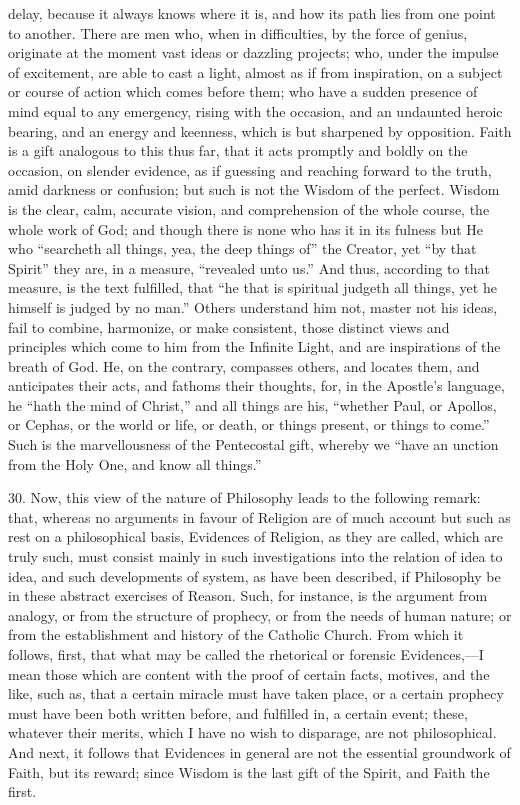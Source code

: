 delay, because it always knows where it is, and how its path lies from
one point to another. There are men who, when in difficulties, by the
force of genius, originate at the moment vast ideas or dazzling
projects; who, under the impulse of excitement, are able to cast a
light, almost as if from inspiration, on a subject or course of action
which comes before them; who have a sudden presence of mind equal to
any emergency, rising with the occasion, and an undaunted heroic
bearing, and an energy and keenness, which is but sharpened by
opposition. Faith is a gift analogous to this thus far, that it acts
promptly and boldly on the occasion, on slender evidence, as if
guessing and reaching forward to the truth, amid darkness or
confusion; but such is not the Wisdom of the perfect. Wisdom is the
clear, calm, accurate vision, and comprehension of the whole course,
the whole work of God; and though there is none who has it in its
fulness but He who ``searcheth all things, yea, the deep things
of'' the Creator, yet ``by that Spirit'' they are, in a
measure, ``revealed unto us.'' And thus, according to that
measure, is the text fulfilled, that ``he that is spiritual
judgeth all things, yet he himself is judged by no man.'' Others
understand him not, master not his ideas, fail to combine, harmonize,
or make consistent, those distinct views and principles which come to
him from the Infinite Light, and are inspirations of the breath of
God. He, on the contrary, compasses others, and locates them, and
anticipates their acts, and fathoms their thoughts, for, in the
Apostle's language, he ``hath the mind of Christ,'' and all
things are his, ``whether Paul, or Apollos, or Cephas, or the
world or life, or death, or things present, or things to come.''
Such is the marvellousness of the Pentecostal gift, whereby we
``have an unction from the Holy One, and know all things.''

30. Now, this view of the nature of Philosophy leads to the
following remark: that, whereas no arguments in favour of Religion are
of much account but such as rest on a philosophical basis, Evidences
of Religion, as they are called, which are truly such, must consist
mainly in such investigations into the relation of idea to idea, and
such developments of system, as have been described, if Philosophy be
in these abstract exercises of Reason. Such, for instance, is the
argument from analogy, or from the structure of prophecy, or from the
needs of human nature; or from the establishment and history of the
Catholic Church. From which it follows, first, that what may be called
the rhetorical or forensic Evidences,—I mean those which are content
with the proof of certain facts, motives, and the like, such as, that
a certain miracle must have taken place, or a certain prophecy must
have been both written before, and fulfilled in, a certain event;
these, whatever their merits, which I have no wish to disparage, are
not philosophical. And next, it follows that Evidences in general are
not the essential groundwork of Faith, but its reward; since Wisdom is
the last gift of the Spirit, and Faith the first.

